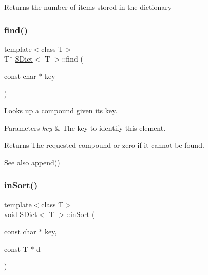 Returns the number of items stored in the dictionary \mbox{\label{class_s_dict_aec67482d780157680d46f48a7ed5e7bd}} 
\subsubsection{\texorpdfstring{find()}{find()}}
{\footnotesize\ttfamily template$<$class T$>$ \\
T$\ast$ \mbox{\hyperlink{class_s_dict}{S\+Dict}}$<$ T $>$\+::find (\begin{DoxyParamCaption}\item[{const char $\ast$}]{key }\end{DoxyParamCaption})\hspace{0.3cm}{\ttfamily [inline]}}

Looks up a compound given its key. 
\begin{DoxyParams}{Parameters}
{\em key} & The key to identify this element. \\
\hline
\end{DoxyParams}
\begin{DoxyReturn}{Returns}
The requested compound or zero if it cannot be found. 
\end{DoxyReturn}
\begin{DoxySeeAlso}{See also}
\mbox{\hyperlink{class_s_dict_a121842d9858421076b81ed663034d62c}{append()}} 
\end{DoxySeeAlso}
\mbox{\label{class_s_dict_a25a85aeba441b4c855ea7be25a4741b5}} 
\subsubsection{\texorpdfstring{inSort()}{inSort()}}
{\footnotesize\ttfamily template$<$class T$>$ \\
void \mbox{\hyperlink{class_s_dict}{S\+Dict}}$<$ T $>$\+::in\+Sort (\begin{DoxyParamCaption}\item[{const char $\ast$}]{key,  }\item[{const T $\ast$}]{d }\end{DoxyParamCaption})\hspace{0.3cm}{\ttfamily [inline]}}


